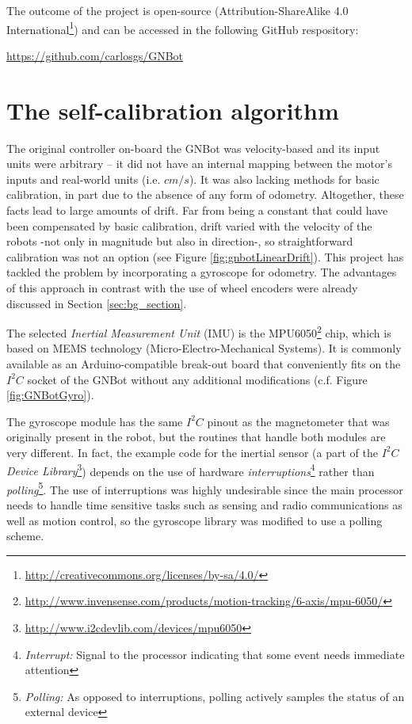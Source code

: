\documentclass[12pt,twoside]{report}
\begin{document}
The outcome of the project is open-source (Attribution-ShareAlike 4.0 International\footnote{\url{http://creativecommons.org/licenses/by-sa/4.0/}}) and can be accessed in the following GitHub respository:

\begin{center}
\large\url{https://github.com/carlosgs/GNBot}
\end{center}







\chapter{The self-calibration algorithm} \label{sec:calib_chap}


The original controller on-board the GNBot was velocity-based and its input units were arbitrary -- it did not have an internal mapping between the motor's inputs and real-world units (i.e. $cm/s$). It was also lacking methods for basic calibration, in part due to the absence of any form of odometry. Altogether, these facts lead to large amounts of drift.
Far from being a constant that could have been compensated by basic calibration, drift varied with the velocity of the robots -not only in magnitude but also in direction-, so straightforward calibration was not an option (see Figure \ref{fig:gnbotLinearDrift}).
This project has tackled the problem by incorporating a gyroscope for odometry. The advantages of this approach in contrast with the use of wheel encoders were already discussed in Section \ref{sec:bg_section}.


The selected \emph{Inertial Measurement Unit} (IMU) is the MPU6050\footnote{\url{http://www.invensense.com/products/motion-tracking/6-axis/mpu-6050/}} chip, which is based on MEMS technology (Micro-Electro-Mechanical Systems). It is commonly available as an Arduino-compatible break-out board that conveniently fits on the $I^2C$ socket of the GNBot without any additional modifications (c.f. Figure \ref{fig:GNBotGyro}).

The gyroscope module has the same $I^2C$ pinout as the magnetometer that was originally present in the robot, but the routines that handle both modules are very different. In fact, the example code for the inertial sensor (a part of the \emph{$I^2C$ Device Library}\footnote{\url{http://www.i2cdevlib.com/devices/mpu6050}}) depends on the use of hardware \emph{interruptions}\footnote{\emph{Interrupt:} Signal to the processor indicating that some event needs immediate attention} rather than \emph{polling}\footnote{\emph{Polling:} As opposed to interruptions, polling actively samples the status of an external device}.
The use of interruptions was highly undesirable since the main processor needs to handle time sensitive tasks such as sensing and radio communications as well as motion control, so the gyroscope library was modified to use a polling scheme.
\end{document}

